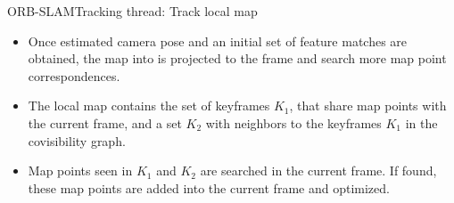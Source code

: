 \documentclass[aspectratio=169]{beamer}
\begin{document}
\begin{frame}{ORB-SLAM}{Tracking thread: Track local map}
    \begin{itemize}
        \item{
        Once estimated camera pose and an initial set of feature matches are obtained, the map into is projected to the frame and search more map point correspondences.
        }
        \item{
        The local map contains the set of keyframes $K_{1}$, that share map points with the current frame, and a set $K_{2}$ with neighbors to the keyframes $K_{1}$ in the covisibility graph.
        }
        \item{
        Map points seen in $K_{1}$ and $K_{2}$ are searched in the current frame. If found, these map points are added into the current frame and optimized.
        }
    \end{itemize}
\end{frame}
\end{document}
